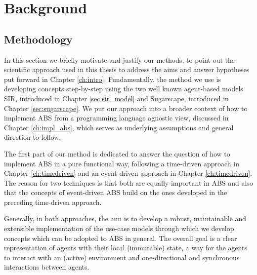 \chapter{Background}
\label{ch:background}







\section{Methodology}

In this section we briefly motivate and justify our methods, to point out the scientific approach used in this thesis to address the aims and answer hypotheses put forward in Chapter \ref{ch:intro}. Fundamentally, the method we use is developing concepts step-by-step using the two well known agent-based models SIR, introduced in Chapter \ref{sec:sir_model} and Sugarscape, introduced in Chapter \ref{sec:sugarscape}. We put our approach into a broader context of how to implement ABS from a programming language agnostic view, discussed in Chapter \ref{ch:impl_abs}, which serves as underlying assumptions and general direction to follow.

The first part of our method is dedicated to answer the question of how to implement ABS in a pure functional way, following a time-driven approach in Chapter \ref{ch:timedriven} and an event-driven approach in Chapter \ref{ch:timedriven}. The reason for two techniques is that both are equally important in ABS and also that the concepts of event-driven ABS build on the ones developed in the preceding time-driven approach.

Generally, in both approaches, the aim is to develop a robust, maintainable and extensible implementation of the use-case models through which we develop concepts which can be adopted to ABS in general. The overall goal is a clear representation of agents with their local (immutable) state, a way for the agents to interact with an (active) environment and one-directional and synchronous interactions between agents. 

